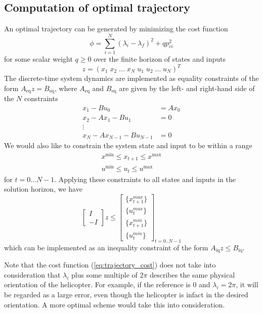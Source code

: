\subsection{Computation of optimal trajectory}
An optimal trajectory can be generated by minimizing the cost function
\begin{equation}
	\label{eq:trajectory_cost}
	\phi = \sum_{i=1}^{N}(\lambda_i - \lambda_f)^2 + qp_{ci}^2
\end{equation}
for some scalar weight $q \geq 0$ over the finite horizon of states and inputs
\begin{equation}
	z = (x_1 \; x_2 \; ... \; x_N \; u_1 \; u_2 \; ... \; u_N)^T
\end{equation}
The discrete-time system dynamics are implemented as equality constraints of the form $A_{\text{eq}}z = B_{\text{eq}}$, where $A_{\text{eq}}$ and $B_{\text{eq}}$ are given by the left- and right-hand side of the $N$ constraints
\begin{align*}
	x_1 - Bu_0        &= Ax_0 \\
	x_2 - Ax_1 - Bu_1 &= 0    \\
	\vdots                    \\
	x_N - Ax_{N-1} - Bu_{N-1} &= 0
\end{align*}
We would also like to constrain the system state and input to be within a range
\begin{align}
	x^{\text{min}} \leq x_{t+1} \leq x^{\text{max}} \\
	u^{\text{min}} \leq u_t \leq u^{\text{max}}
\end{align}
for $t = 0...N-1$. Applying these constraints to all states and inputs in the solution horizon, we have
\begin{equation}
	\begin{bmatrix} I \\ -I \end{bmatrix} z
	\leq
	\begin{bmatrix}
	\{x_{t+1}^{max}\} \\
	\{u_t^{max}\} \\
	\{x_{t+1}^{min}\} \\
	\{u_t^{min}\}
	\end{bmatrix}_{t=0..N-1}
\end{equation}
which can be implemented as an inequality constraint of the form $A_{\text{iq}} z \leq B_{\text{iq}}$.

Note that the cost function (\ref{eq:trajectory_cost}) does not take into consideration that $\lambda_i$ plus some multiple of $2\pi$ describes the same physical orientation of the helicopter. For example, if the reference is $0$ and $\lambda_i = 2\pi$, it will be regarded as a large error, even though the helicopter is infact in the desired orientation. A more optimal scheme would take this into consideration.
